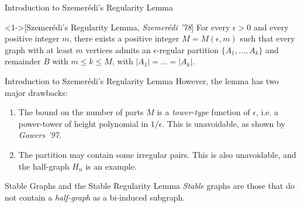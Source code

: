 \documentclass{beamer}
\newcommand{\parcurly}[1]{\{ #1 \}}
\begin{document}
\begin{frame}{Introduction to Szemerédi's Regularity Lemma}
    \begin{theorem}<1->[Szemerédi's Regularity Lemma, \textit{Szemerédi '78}]
        For every $\epsilon > 0$ and every positive integer $m$, there exists a positive integer $M = M(\epsilon, m)$
        such that every graph with at least $m$ vertices admits an $\epsilon$-regular partition
        $\parcurly{A_1, \ldots, A_k}$ and remainder $B$ with $m \leq k \leq M$, with $|A_1| = \dots = |A_k|$.
    \end{theorem}

\end{frame}

\begin{frame}{Introduction to Szemerédi's Regularity Lemma}
    However, the lemma has two major drawbacks:
    \begin{enumerate}
        \item The bound on the number of parts $M$ is a \emph{tower-type} function of $\epsilon$,
            i.e. a power-tower of height polynomial in $1/\epsilon$.
            This is unavoidable, as shown by \textit{Gowers '97}.
        \item The partition may contain some irregular pairs.
            This is also unavoidable, and the half-graph $H_n$ is an example.
    \end{enumerate}
\end{frame}


\begin{frame}{Stable Graphs and the Stable Regularity Lemma}
    \emph{Stable} graphs are those that do not contain a \emph{half-graph} as a bi-induced subgraph.
    
\end{frame}
\end{document}

